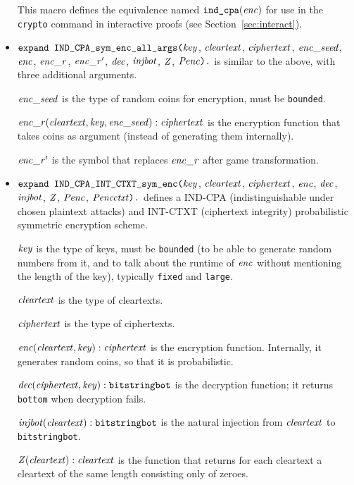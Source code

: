 \documentclass{article}
\begin{document}
\begin{itemize}
   This macro defines the equivalence named $\texttt{ind\_cpa}(\mathit{enc})$
   for use in the \texttt{crypto} command in interactive proofs
   (see Section~\ref{sec:interact}).

\item $\texttt{expand IND\_CPA\_sym\_enc\_all\_args(}\mathit{key}$,
  $\mathit{cleartext}$, $\mathit{ciphertext}$, $\mathit{enc\_seed}$, $\mathit{enc}$, $\mathit{enc\_r}$, $\mathit{enc\_r}'$,
  $\mathit{dec}$, $\mathit{injbot}$, $\mathit{Z}$, $\mathit{Penc}\texttt{).}$ is similar to the above,
  with three additional arguments. 

  $\mathit{enc\_seed}$ is the type of random coins for encryption, must be \texttt{bounded}.

  $\mathit{enc\_r}(\mathit{cleartext}, \mathit{key}, \mathit{enc\_seed}): \mathit{ciphertext}$ is the encryption function that takes coins as argument (instead of generating them internally).

  $\mathit{enc\_r}'$ is the symbol that replaces $\mathit{enc\_r}$ after game transformation.

\item $\texttt{expand IND\_CPA\_INT\_CTXT\_sym\_enc(}\mathit{key}$,
  $\mathit{cleartext}$, $\mathit{ciphertext}$, $\mathit{enc}$,
  $\mathit{dec}$, $\mathit{injbot}$, $\mathit{Z}$, $\mathit{Penc}$, $\mathit{Pencctxt}\texttt{).}$ defines a
  IND-CPA (indistinguishable under chosen plaintext attacks) and INT-CTXT (ciphertext integrity)
  probabilistic symmetric encryption scheme.

   $\mathit{key}$ is the type of keys, must be \texttt{bounded} (to be able to generate random numbers from it, and to talk about the runtime of $\mathit{enc}$ without mentioning the length of the key), typically \texttt{fixed} and \texttt{large}.

   $\mathit{cleartext}$ is the type of cleartexts.

   $\mathit{ciphertext}$ is the type of ciphertexts.

   $\mathit{enc}(\mathit{cleartext}, \mathit{key}): \mathit{ciphertext}$ is the encryption function. Internally, it generates random coins, so that it is probabilistic.

   $\mathit{dec}(\mathit{ciphertext}, \mathit{key}): \texttt{bitstringbot}$ is the
  decryption function; it returns \texttt{bottom} when decryption
  fails.

   $\mathit{injbot}(\mathit{cleartext}): \texttt{bitstringbot}$ is the natural
  injection from $\mathit{cleartext}$ to \texttt{bitstringbot}.

   $\mathit{Z}(\mathit{cleartext}): \mathit{cleartext}$ is the function that
  returns for each cleartext a cleartext of the same length consisting
  only of zeroes.


\end{itemize}
\end{document}
